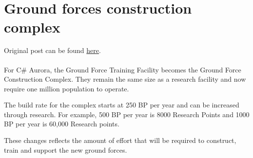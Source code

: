 \documentclass[../../Aurora C# unofficial manual.tex]{subfiles}
\begin{document}
	\section{Ground forces construction complex}
	Original post can be found
	\href{http://aurora2.pentarch.org/index.php?topic=8495.msg110520#msg110520}{here}.
	\\\\
	
	For C\# Aurora, the Ground Force Training Facility becomes the Ground Force Construction Complex. They remain the same size as a research facility and now require one million population to operate.
	
	The build rate for the complex starts at 250 BP per year and can be increased through research. For example, 500 BP per year is 8000 Research Points and 1000 BP per year is 60,000 Research points.
	
	These changes reflects the amount of effort that will be required to construct, train and support the new ground forces.
\end{document}
